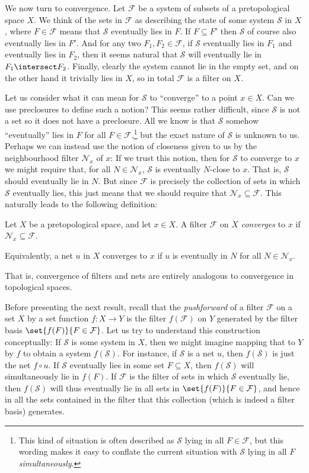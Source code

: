 \documentclass[article, a4paper, 11pt, oneside]{memoir}
\numberwithin{equation}{chapter}
\newcommand{\calF}{\mathcal{F}}
\newcommand{\calS}{\mathcal{S}}
\newcommand{\calN}{\mathcal{N}}
\newcommand{\nhoods}[1]{\calN_{#1}}
\begin{document}
\fleuronbreak

We now turn to convergence. Let $\calF$ be a system of subsets of a pretopological space $X$. We think of the sets in $\calF$ as describing the state of some system $\calS$ in $X$, where $F \in \calF$ means that $\calS$ eventually lies in $F$. If $F \subseteq F'$ then $\calS$ of course also eventually lies in $F'$. And for any two $F_1, F_2 \in \calF$, if $\calS$ eventually lies in $F_1$ and eventually lies in $F_2$, then it seems natural that $\calS$ will eventually lie in $F_1 \intersect F_2$. Finally, clearly the system cannot lie in the empty set, and on the other hand it trivially lies in $X$, so in total $\calF$ is a filter on $X$.

Let us consider what it can mean for $\calS$ to \enquote{converge} to a point $x \in X$. Can we use preclosures to define such a notion? This seems rather difficult, since $\calS$ is not a set so it does not have a preclosure. All we know is that $\calS$ somehow \enquote{eventually} lies in $F$ for all $F \in \calF$,\footnote{This kind of situation is often described as $\calS$ lying in all $F \in \calF$, but this wording makes it easy to conflate the current situation with $\calS$ lying in all $F$ \emph{simultaneously}.} but the exact nature of $\calS$ is unknown to us. Perhaps we can instead use the notion of closeness given to us by the neighbourhood filter $\nhoods{x}$ of $x$: If we trust this notion, then for $\calS$ to converge to $x$ we might require that, for all $N \in \nhoods{x}$, $\calS$ is eventually $N$-close to $x$. That is, $\calS$ should eventually lie in $N$. But since $\calF$ is precisely the collection of sets in which $\calS$ eventually lies, this just means that we should require that $\nhoods{x} \subseteq \calF$. This naturally leads to the following definition:

\begin{definition}[Convergence]
    Let $X$ be a pretopological space, and let $x \in X$. A filter $\calF$ on $X$ \emph{converges} to $x$ if $\nhoods{x} \subseteq \calF$.

    Equivalently, a net $u$ in $X$ converges to $x$ if $u$ is eventually in $N$ for all $N \in \nhoods{x}$.
\end{definition}
%
That is, convergence of filters and nets are entirely analogous to convergence in topological spaces.

Before presenting the next result, recall that the \emph{pushforward} of a filter $\calF$ on a set $X$ by a set function $f \colon X \to Y$ is the filter $f(\calF)$ on $Y$ generated by the filter basis $\set{f(F)}{F \in \calF}$. Let us try to understand this construction conceptually: If $\calS$ is some system in $X$, then we might imagine mapping that to $Y$ by $f$ to obtain a system $f(\calS)$. For instance, if $\calS$ is a net $u$, then $f(\calS)$ is just the net $f \circ u$. If $\calS$ eventually lies in some set $F \subseteq X$, then $f(\calS)$ will simultaneously lie in $f(F)$. If $\calF$ is the filter of sets in which $\calS$ eventually lie, then $f(\calS)$ will thus eventually lie in all sets in $\set{f(F)}{F \in \calF}$, and hence in all the sets contained in the filter that this collection (which is indeed a filter basis) generates.
\end{document}
